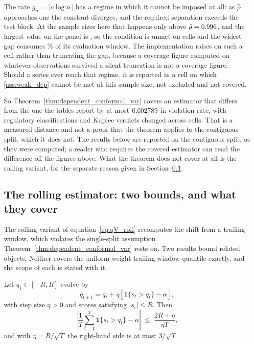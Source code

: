 The rate $g_n = \lceil c\log n\rceil$ has a regime in which it cannot be
imposed at all: as $\hat\rho$ approaches one the constant diverges, and the
required separation exceeds the test block. At the sample sizes here that
happens only above $\hat\rho = 0.996$, and the largest value on the
panel is \nGapMaxRho, so the condition is unmet on \nGapCellsUnmet{} cells and
the widest gap consumes \nGapWidestPct\% of its evaluation window. The
implementation raises on such a cell rather than truncating the gap, because a
coverage figure computed on whatever observations survived a silent truncation
is not a coverage figure. Should a series ever reach that regime, it is reported
as a cell on which \ref{ass:weak_dep} cannot be met at this sample size, not
excluded and not covered.

So Theorem~\ref{thm:dependent_conformal_var} covers an estimator that differs
from the one the tables report by at most $0.002789$ in violation rate,
with \nGapAllZoneChanges{} regulatory classifications and
\nGapAllKupFlips{} Kupiec verdicts changed across \nGapAllCells{} cells. That
is a measured distance and not a proof that the theorem applies to the
contiguous split, which it does not. The results below are reported on the
contiguous split, as they were computed; a reader who requires the covered
estimator can read the difference off the figures above. What the theorem does
not cover at all is the rolling variant, for the separate reason given in
Section~\ref{sec:theory_rolling}.

\subsection{The rolling estimator: two bounds, and what they cover}
\label{sec:theory_rolling}

The rolling variant of equation~\eqref{eq:qV_roll} recomputes the shift from a
trailing window, which violates the single-split assumption
Theorem~\ref{thm:dependent_conformal_var} rests on. Two results bound related
objects. Neither covers the uniform-weight trailing-window quantile exactly, and
the scope of each is stated with it.

\begin{proposition}
	\label{prop:ogd_regret}
	Let $q_1\in[-R,R]$ evolve by
	\begin{equation}
		\label{eq:ogd_update}
		q_{t+1} = q_t + \eta\left[\mathbf 1\{s_t>q_t\}-\alpha\right],
	\end{equation}
	with step size $\eta>0$ and scores satisfying $|s_t|\le R$. Then
	\begin{equation}
		\label{eq:ogd_bound}
		\left|\frac1T\sum_{t=1}^{T}\mathbf 1\{s_t>q_t\}-\alpha\right|
		\;\le\;
		\frac{2R+\eta}{\eta T},
	\end{equation}
	and with $\eta = R/\sqrt T$ the right-hand side is at most $3/\sqrt T$.
\end{proposition}

